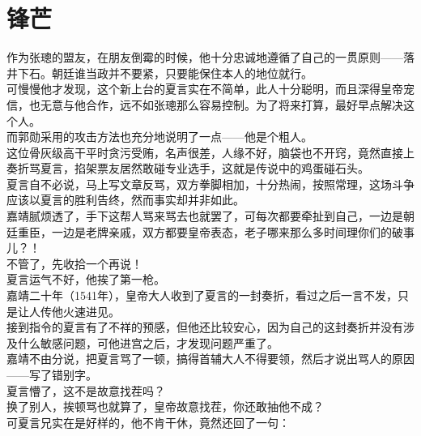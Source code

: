 \section{锋芒}
\ifnum{}
	\begin{multicols}{\theparacolNo}
\fi
作为张璁的盟友，在朋友倒霉的时候，他十分忠诚地遵循了自己的一贯原则——落井下石。朝廷谁当政并不要紧，只要能保住本人的地位就行。\\

可慢慢他才发现，这个新上台的夏言实在不简单，此人十分聪明，而且深得皇帝宠信，也无意与他合作，远不如张璁那么容易控制。为了将来打算，最好早点解决这个人。\\

而郭勋采用的攻击方法也充分地说明了一点——他是个粗人。\\

这位骨灰级高干平时贪污受贿，名声很差，人缘不好，脑袋也不开窍，竟然直接上奏折骂夏言，掐架票友居然敢碰专业选手，这就是传说中的鸡蛋碰石头。\\

夏言自不必说，马上写文章反骂，双方拳脚相加，十分热闹，按照常理，这场斗争应该以夏言的胜利告终，然而事实却并非如此。\\

嘉靖腻烦透了，手下这帮人骂来骂去也就罢了，可每次都要牵扯到自己，一边是朝廷重臣，一边是老牌亲戚，双方都要皇帝表态，老子哪来那么多时间理你们的破事儿？！\\

不管了，先收拾一个再说！\\

夏言运气不好，他挨了第一枪。\\

嘉靖二十年（1541年），皇帝大人收到了夏言的一封奏折，看过之后一言不发，只是让人传他火速进见。\\

接到指令的夏言有了不祥的预感，但他还比较安心，因为自己的这封奏折并没有涉及什么敏感问题，可他进宫之后，才发现问题严重了。\\

嘉靖不由分说，把夏言骂了一顿，搞得首辅大人不得要领，然后才说出骂人的原因——写了错别字。\\

夏言懵了，这不是故意找茬吗？\\

换了别人，挨顿骂也就算了，皇帝故意找茬，你还敢抽他不成？\\

可夏言兄实在是好样的，他不肯干休，竟然还回了一句：\\


\end{multicols}
